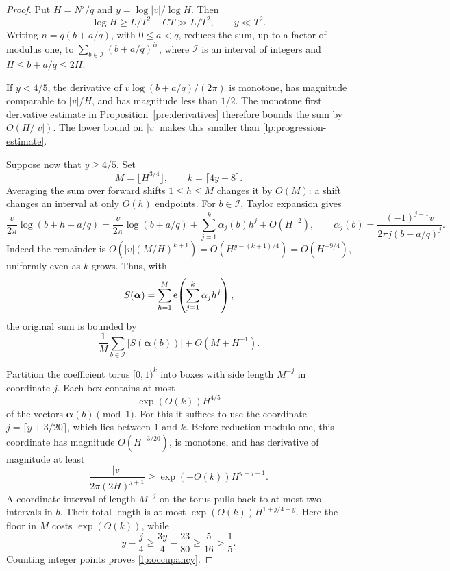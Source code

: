 \begin{proof}
Put $H=N'/q$ and $y=\log|v|/\log H$.  Then
\begin{equation}\label{lp:phase-scales}
 \log H\ge L/T^2-CT\gg L/T^2,\qquad y\ll T^2.
\end{equation}
Writing $n=q(b+a/q)$, with $0\le a<q$, reduces the sum, up to a
factor of modulus one, to $\sum_{b\in\mathcal I}(b+a/q)^{iv}$,
where $\mathcal I$ is an interval of integers and
$H\le b+a/q\le2H$.

If $y<4/5$, the derivative of
$v\log(b+a/q)/(2\pi)$ is monotone, has magnitude comparable to
$|v|/H$, and has magnitude less than $1/2$.  The monotone first
derivative estimate in Proposition~\ref{pre:derivatives} therefore bounds
the sum by $O(H/|v|)$.
The lower bound on $|v|$ makes this smaller than
\eqref{lp:progression-estimate}.

Suppose now that $y\ge4/5$.  Set
\[
 M=\lfloor H^{3/4}\rfloor,\qquad k=\lceil4y+8\rceil.
\]
Averaging the sum over forward shifts $1\le h\le M$ changes it by
$O(M)$: a shift changes an interval at only $O(h)$ endpoints.
For $b\in\mathcal I$, Taylor expansion gives
\[
 \frac{v}{2\pi}\log(b+h+a/q)
 =\frac{v}{2\pi}\log(b+a/q)
       +\sum_{j=1}^k\alpha_j(b)h^j+O(H^{-2}),
 \qquad
 \alpha_j(b)=\frac{(-1)^{j-1}v}{2\pi j(b+a/q)^j}.
\]
Indeed the remainder is
$O(|v|(M/H)^{k+1})=O(H^{y-(k+1)/4})=O(H^{-9/4})$,
uniformly even as $k$ grows.  Thus, with
\[
 S(\boldsymbol\alpha)=\sum_{h=1}^M
                 \mathrm{e}\!\left(\sum_{j=1}^k\alpha_jh^j\right),
\]
the original sum is bounded by
\begin{equation}\label{lp:shifted-phase}
 \frac1M\sum_{b\in\mathcal I}|S(\boldsymbol\alpha(b))|
       +O(M+H^{-1}).
\end{equation}

Partition the coefficient torus $[0,1)^k$ into boxes with side length
$M^{-j}$ in coordinate $j$.  Each box contains at most
\begin{equation}\label{lp:occupancy}
 \exp(O(k))H^{4/5}
\end{equation}
of the vectors $\boldsymbol\alpha(b)\pmod1$.
For this it suffices to use the coordinate
$j=\lceil y+3/20\rceil$, which lies between $1$ and $k$.
Before reduction modulo one, this coordinate has magnitude
$O(H^{-3/20})$, is monotone, and has derivative of magnitude at least
\[
 \frac{|v|}{2\pi(2H)^{j+1}}
       \ge\exp(-O(k))H^{y-j-1}.
\]
A coordinate interval of length $M^{-j}$ on the torus pulls back to
at most two intervals in $b$.  Their total length is at most
$\exp(O(k))H^{1+j/4-y}$.  Here the floor in $M$ costs
$\exp(O(k))$, while
\[
 y-\frac j4\ge\frac{3y}4-\frac{23}{80}
       \ge\frac5{16}>\frac15.
\]
Counting integer points proves \eqref{lp:occupancy}.


\end{proof}
